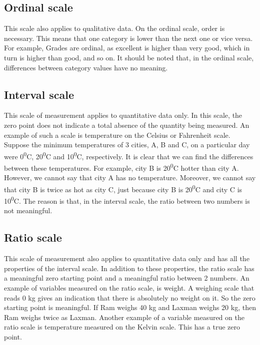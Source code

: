 \documentclass[
]{book}
\begin{document}
\hypertarget{ordinal-scale}{%
\subsection{Ordinal scale}\label{ordinal-scale}}

This scale also applies to qualitative data. On the ordinal scale, order
is necessary. This means that one category is lower than the next one or
vice versa. For example, Grades are ordinal, as excellent is higher than
very good, which in turn is higher than good, and so on. It should be
noted that, in the ordinal scale, differences between category values
have no meaning.

\hypertarget{interval-scale}{%
\subsection{Interval scale}\label{interval-scale}}

This scale of measurement applies to quantitative data only. In this
scale, the zero point does not indicate a total absence of the quantity
being measured. An example of such a scale is temperature on the Celsius
or Fahrenheit scale. Suppose the minimum temperatures of 3 cities, A, B
and C, on a particular day were 0\textsuperscript{0}C, 20\textsuperscript{0}C and 10\textsuperscript{0}C, respectively.
It is clear that we can find the differences between these temperatures.
For example, city B is 20\textsuperscript{0}C hotter than city A. However, we cannot say
that city A has no temperature. Moreover, we cannot say that city B is
twice as hot as city C, just because city B is 20\textsuperscript{0}C and city C is
10\textsuperscript{0}C. The reason is that, in the interval scale, the ratio between two
numbers is not meaningful.

\hypertarget{ratio-scale}{%
\subsection{Ratio scale}\label{ratio-scale}}

This scale of measurement also applies to quantitative data only and has
all the properties of the interval scale. In addition to these
properties, the ratio scale has a meaningful zero starting point and a
meaningful ratio between 2 numbers. An example of variables measured on
the ratio scale, is weight. A weighing scale that reads 0 kg gives an
indication that there is absolutely no weight on it. So the zero
starting point is meaningful. If Ram weighs 40 kg and Laxman weighs 20
kg, then Ram weighs twice as Laxman. Another example of a variable
measured on the ratio scale is temperature measured on the Kelvin scale.
This has a true zero point.
\end{document}
